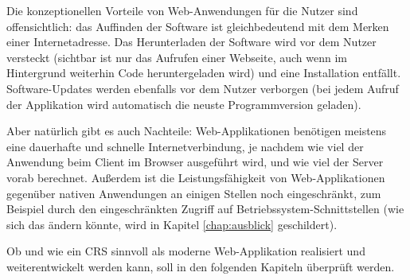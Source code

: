 Die konzeptionellen Vorteile von Web-Anwendungen für die Nutzer sind offensichtlich: das Auffinden der Software ist gleichbedeutend mit dem Merken einer Internetadresse. Das Herunterladen der Software wird vor dem Nutzer versteckt (sichtbar ist nur das Aufrufen einer Webseite, auch wenn im Hintergrund weiterhin Code heruntergeladen wird) und eine Installation entfällt. Software-Updates werden ebenfalls vor dem Nutzer verborgen (bei jedem Aufruf der Applikation wird automatisch die neuste Programmversion geladen).

Aber natürlich gibt es auch Nachteile: Web-Applikationen benötigen meistens eine dauerhafte und schnelle Internetverbindung, je nachdem wie viel der Anwendung beim Client im Browser ausgeführt wird, und wie viel der Server vorab berechnet. Außerdem ist die Leistungsfähigkeit von Web-Applikationen gegenüber nativen Anwendungen an einigen Stellen noch eingeschränkt, zum Beispiel durch den eingeschränkten Zugriff auf Betriebssystem-Schnittstellen (wie sich das ändern könnte, wird in Kapitel \ref{chap:ausblick} geschildert).

Ob und wie ein CRS sinnvoll als moderne Web-Applikation realisiert und weiterentwickelt werden kann, soll in den folgenden Kapiteln überprüft werden.

